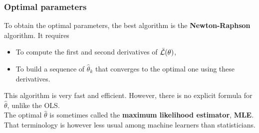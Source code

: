 \begin{frame}
\frametitle{Optimal parameters}
To obtain the optimal parameters, the best algorithm is the {\bf Newton-Raphson} algorithm. It requires 
\begin{itemize}
\item To compute the first and second derivatives of $\bar{\cal L}(\theta)$,
\item To build a sequence of $\hat{\theta}_k$ that converges to the optimal one using these derivatives. 
\end{itemize}
This algorithm is very fast and efficient. However, there is no explicit formula for $\hat{\theta}$, unlike the OLS.\\
\vspace{0.3cm}
The optimal $\hat{\theta}$ is sometimes called the {\bf maximum likelihood estimator}, {\bf MLE}. That terminology is however less usual among machine learners than statisticians.
\end{frame}

